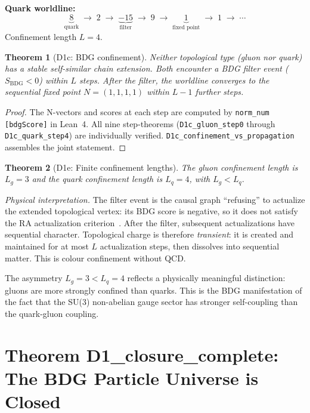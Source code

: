 \documentclass[11pt,a4paper]{article}
\newtheorem{theorem}{Theorem}[section]
\newcommand{\SBDG}{S_{\mathrm{BDG}}}
\begin{document}
\medskip
\noindent\textbf{Quark worldline:}
\[
  \underbrace{8}_{\text{quark}} \;\to\; 2 \;\to\;
  \underbrace{-15}_{\text{filter}} \;\to\;
  9 \;\to\; \underbrace{1}_{\text{fixed point}} \;\to\; 1 \;\to\; \cdots
\]
Confinement length $L = 4$.

\begin{theorem}[D1c: BDG confinement]
\label{thm:D1c}
Neither topological type (gluon nor quark) has a stable self-similar
chain extension. Both encounter a BDG filter event ($\SBDG < 0$)
within $L$ steps. After the filter, the worldline converges to the
sequential fixed point $N=(1,1,1,1)$ within $L-1$ further steps.
\end{theorem}

\begin{proof}
The N-vectors and scores at each step are computed by
\texttt{norm\_num [bdgScore]} in Lean~4. All nine step-theorems
(\texttt{D1c\_gluon\_step0} through \texttt{D1c\_quark\_step4}) are
individually verified. \texttt{D1c\_confinement\_vs\_propagation}
assembles the joint statement.
\end{proof}

\begin{theorem}[D1e: Finite confinement lengths]
\label{thm:D1e}
The gluon confinement length is $L_g = 3$ and the quark confinement
length is $L_q = 4$, with $L_g < L_q$.
\end{theorem}

\noindent\emph{Physical interpretation.} The filter event is the causal
graph ``refusing'' to actualize the extended topological vertex: its BDG
score is negative, so it does not satisfy the RA actualization
criterion~\citep{Sandeman2026RAQM}. After the filter, subsequent
actualizations have sequential character. Topological charge is
therefore \emph{transient}: it is created and maintained for at most
$L$ actualization steps, then dissolves into sequential matter.
This is colour confinement without QCD.

The asymmetry $L_g = 3 < L_q = 4$ reflects a physically meaningful
distinction: gluons are more strongly confined than quarks. This is
the BDG manifestation of the fact that the SU(3) non-abelian gauge
sector has stronger self-coupling than the quark-gluon coupling.

\section{Theorem D1\_closure\_complete: The BDG Particle Universe is Closed}
\label{sec:closure}
\end{document}
